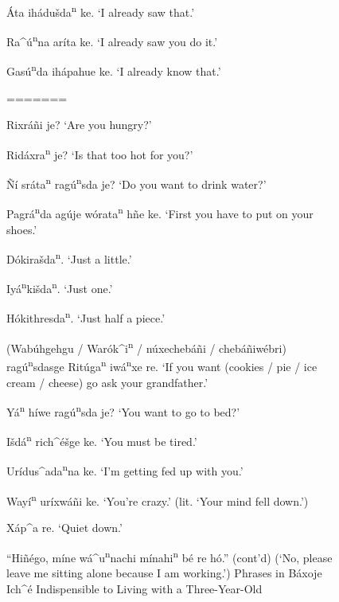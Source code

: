 \documentclass[output=paper]{LSP/langsci}
\begin{document}
\begin{figure}[p]
\begin{list}{}{}
\item{}
\item{\'Ata ihádu\v{s}da\textsuperscript{n} ke.	`I already saw that.'}
\item{Ra\^{ }\'u\textsuperscript{n}na aríta ke.	`I already saw you do it.'}
\item{Gas\'u\textsuperscript{n}da ihápahue ke.	 `I already know that.'}
\item{}
\end{list} 
\caption{``Hiñ\'ego, míne wá\^{ }u\textsuperscript{n}nachi mínahi\textsuperscript{n} b\'e re hó.'' (cont'd)\newline
(`No, please leave me sitting alone because I am working.')\newline
Phrases in Báxoje Ich\^{ }\'e Indispensible to Living with a Three-Year-Old}
=======
\item{Rixr\'a\~ni je? `Are you hungry?'}
\item{Rid\'axra\textsuperscript{n} je? `Is that too hot for you?'}
\item{\~N\'i sr\'ata\textsuperscript{n} rag\'u\textsuperscript{n}sda je? `Do you want to drink water?'}
\item{Pagr\'a\textsuperscript{n}da ag\'uje w\'orata\textsuperscript{n} h\~ne ke. `First you have to put on your shoes.'}
\item{D\'okira\v{s}da\textsuperscript{n}.	`Just a little.'}
\item{}
\item{Iy\'a\textsuperscript{n}ki\v{s}da\textsuperscript{n}. `Just one.'}
\item{H\'okithre{s}da\textsuperscript{n}. `Just half a piece.'}
\item{(Wab\'uhgehgu / War\'ok\^{ }i\textsuperscript{n} / n\'uxecheb\'a\~ni / cheb\'a\~niw\'ebri) rag\'u\textsuperscript{n}sdasge Rit\'uga\textsuperscript{n} iw\'a\textsuperscript{n}xe re. `If you want (cookies / pie / ice cream / cheese) go ask your grandfather.'}
\item{Y\'a\textsuperscript{n} h\'iwe rag\'u\textsuperscript{n}sda je? `You want to go to bed?'}
\item{I\v{s}d\'a\textsuperscript{n} rich\^{ }\'e\v{s}ge ke. `You must be tired.'}
\item{}
\item{Ur\'idus\^{ }ada\textsuperscript{n}na ke. `I'm getting fed up with you.'}
\item{Way\'i\textsuperscript{n} ur\'ixw\'a\~ni ke. `You're crazy.' (lit. `Your mind fell down.')}
\item{X\'ap\^{ }a re. `Quiet down.'}

\end{figure}
\end{document}
